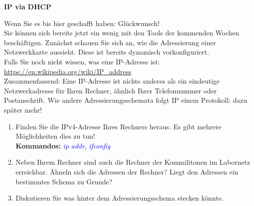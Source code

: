 \documentclass[paper=a4,fontsize=11pt]{scrartcl}%
\numberwithin{equation}{section}
\begin{document}
\begin{center}\Large{\textbf{IP via DHCP}}\end{center}\vskip0.25in
Wenn Sie es bis hier geschafft haben: Glückwunsch!\\
Sie können sich bereits jetzt ein wenig mit den Tools der kommenden Wochen beschäftigen. Zunächst schauen Sie sich an, wie die Adressierung einer Netzwerkkarte aussieht. Diese ist bereits dynamisch vorkonfiguriert.\\
Falls Sie noch nicht wissen, was eine IP-Adresse ist: \url	{https://en.wikipedia.org/wiki/IP_address}\\
Zusammenfassend: Eine IP-Adresse ist nichts anderes als ein eindeutige Netzwerkadresse für Ihren Rechner, ähnlich Ihrer Telefonnummer oder Postanschrift. Wie andere Adressierungsschemata folgt IP einem Protokoll: dazu später mehr!
\begin{enumerate}
	\item Finden Sie die IPv4-Adresse Ihres Rechners heraus. Es gibt mehrere Möglichkeiten dies zu tun!\\
	\textbf{Kommandos:} \textcolor{blue}{\emph{ip addr}, \emph{ifconfig}}
	\item Neben Ihrem Rechner sind auch die Rechner der Kommilitonen im Labornetz erreichbar. Ähneln sich die Adressen der Rechner? Liegt den Adressen ein bestimmtes Schema zu Grunde?\\
	\item Diskutieren Sie was hinter dem Adressierungsschema stecken könnte.
\end{enumerate}
\end{document}
